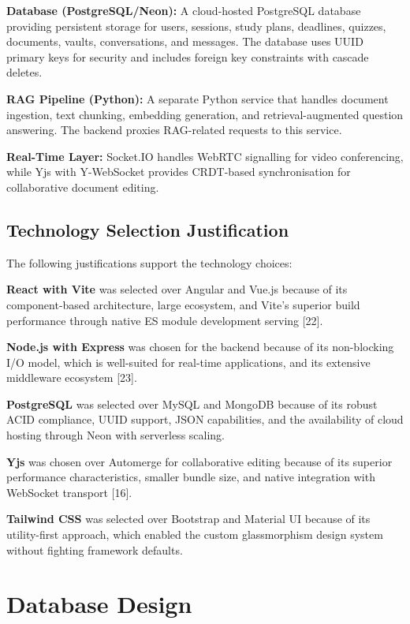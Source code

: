 \documentclass[12pt,a4paper]{report}
\begin{document}
\textbf{Database (PostgreSQL/Neon):} A cloud-hosted PostgreSQL database providing persistent storage for users, sessions, study plans, deadlines, quizzes, documents, vaults, conversations, and messages. The database uses UUID primary keys for security and includes foreign key constraints with cascade deletes.

\textbf{RAG Pipeline (Python):} A separate Python service that handles document ingestion, text chunking, embedding generation, and retrieval-augmented question answering. The backend proxies RAG-related requests to this service.

\textbf{Real-Time Layer:} Socket.IO handles WebRTC signalling for video conferencing, while Yjs with Y-WebSocket provides CRDT-based synchronisation for collaborative document editing.

\subsection{Technology Selection Justification}

The following justifications support the technology choices:

\textbf{React with Vite} was selected over Angular and Vue.js because of its component-based architecture, large ecosystem, and Vite's superior build performance through native ES module development serving [22].

\textbf{Node.js with Express} was chosen for the backend because of its non-blocking I/O model, which is well-suited for real-time applications, and its extensive middleware ecosystem [23].

\textbf{PostgreSQL} was selected over MySQL and MongoDB because of its robust ACID compliance, UUID support, JSON capabilities, and the availability of cloud hosting through Neon with serverless scaling.

\textbf{Yjs} was chosen over Automerge for collaborative editing because of its superior performance characteristics, smaller bundle size, and native integration with WebSocket transport [16].

\textbf{Tailwind CSS} was selected over Bootstrap and Material UI because of its utility-first approach, which enabled the custom glassmorphism design system without fighting framework defaults.

\section{Database Design}
\end{document}
